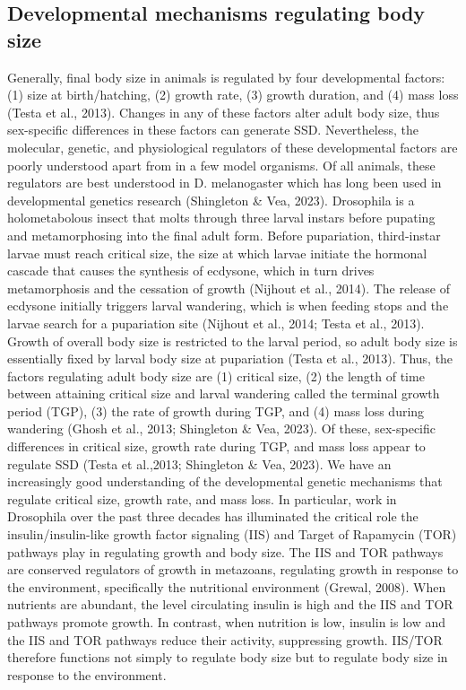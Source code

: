\documentclass[
  11pt,
]{article}
\begin{document}
\subsection{Developmental mechanisms regulating body size}

Generally, final body size in animals is regulated by four developmental
factors: (1) size at birth/hatching, (2) growth rate, (3) growth
duration, and (4) mass loss (Testa et al., 2013). Changes in any of
these factors alter adult body size, thus sex-specific differences in
these factors can generate SSD. Nevertheless, the molecular, genetic,
and physiological regulators of these developmental factors are poorly
understood apart from in a few model organisms. Of all animals, these
regulators are best understood in D. melanogaster which has long been
used in developmental genetics research (Shingleton \& Vea, 2023).
Drosophila is a holometabolous insect that molts through three larval
instars before pupating and metamorphosing into the final adult form.
Before pupariation, third-instar larvae must reach critical size, the
size at which larvae initiate the hormonal cascade that causes the
synthesis of ecdysone, which in turn drives metamorphosis and the
cessation of growth (Nijhout et al., 2014). The release of ecdysone
initially triggers larval wandering, which is when feeding stops and the
larvae search for a pupariation site (Nijhout et al., 2014; Testa et
al., 2013). Growth of overall body size is restricted to the larval
period, so adult body size is essentially fixed by larval body size at
pupariation (Testa et al., 2013). Thus, the factors regulating adult
body size are (1) critical size, (2) the length of time between
attaining critical size and larval wandering called the terminal growth
period (TGP), (3) the rate of growth during TGP, and (4) mass loss
during wandering (Ghosh et al., 2013; Shingleton \& Vea, 2023). Of
these, sex-specific differences in critical size, growth rate during
TGP, and mass loss appear to regulate SSD (Testa et al.,2013; Shingleton
\& Vea, 2023). We have an increasingly good understanding of the
developmental genetic mechanisms that regulate critical size, growth
rate, and mass loss. In particular, work in Drosophila over the past
three decades has illuminated the critical role the insulin/insulin-like
growth factor signaling (IIS) and Target of Rapamycin (TOR) pathways
play in regulating growth and body size. The IIS and TOR pathways are
conserved regulators of growth in metazoans, regulating growth in
response to the environment, specifically the nutritional environment
(Grewal, 2008). When nutrients are abundant, the level circulating
insulin is high and the IIS and TOR pathways promote growth. In
contrast, when nutrition is low, insulin is low and the IIS and TOR
pathways reduce their activity, suppressing growth. IIS/TOR therefore
functions not simply to regulate body size but to regulate body size in
response to the environment.
\end{document}
